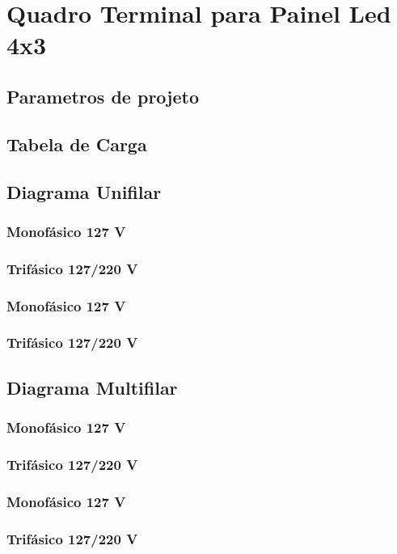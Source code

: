\section{Quadro Terminal para Painel Led 4x3}
\subsection{Parametros de projeto}
\subsection{Tabela de Carga}
\subsection{Diagrama Unifilar}
\subsubsection{Monofásico 127 V}
\subsubsection{Trifásico 127/220 V}
\subsubsection{Monofásico 127 V}
\subsubsection{Trifásico 127/220 V}

\subsection{Diagrama Multifilar}
\subsubsection{Monofásico 127 V}
\subsubsection{Trifásico 127/220 V}
\subsubsection{Monofásico 127 V}
\subsubsection{Trifásico 127/220 V}

